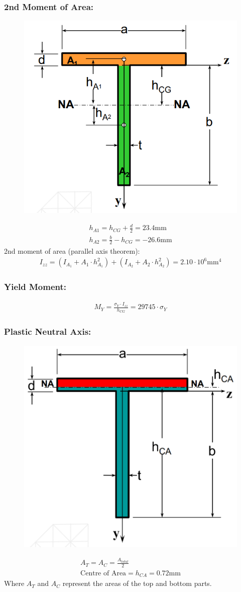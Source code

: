 \documentclass[class=report, crop=false, 12pt,a4paper]{standalone}
\begin{document}
\subsubsection{2nd Moment of Area:}
\begin{figure}[H]
  \centering
  \includegraphics[width = 0.4 \textwidth]{../img/diagram5.PNG}
\end{figure}
\begin{gather}
  h_{A1} = h_{CG}+\frac{d}{2} = 23.4 \text{mm} \\
  h_{A2} = \frac{b}{2}-h_{CG} = -26.6 \text{mm}
\end{gather}
2nd moment of area (parallel axis theorem):
\begin{gather}
  I_{zz} = (I_{A_1}+A_1\cdot h_{A_1}^2)+(I_{A_2}+A_2\cdot h_{A_2}^2) = 2.10\cdot 10^6 \text{mm}^4
\end{gather}
\subsubsection{Yield Moment:}
\begin{gather}
  M_Y = \frac{\sigma_Y \cdot I_{zz}}{h_{CG}} = 29745\cdot\sigma_Y
\end{gather}
\subsubsection{Plastic Neutral Axis:}
\begin{figure}[H]
  \centering
  \includegraphics[width = 0.4 \textwidth]{../img/diagram6.PNG}
\end{figure}
\begin{gather}
  A_T = A_C = \frac{A_{total}}{2} \\[10pt]
  \text{Centre of Area} = h_{CA} = 0.72\text{mm}
\end{gather}
Where $A_T$ and $A_C$ represent the areas of the top and bottom parts.
\end{document}
